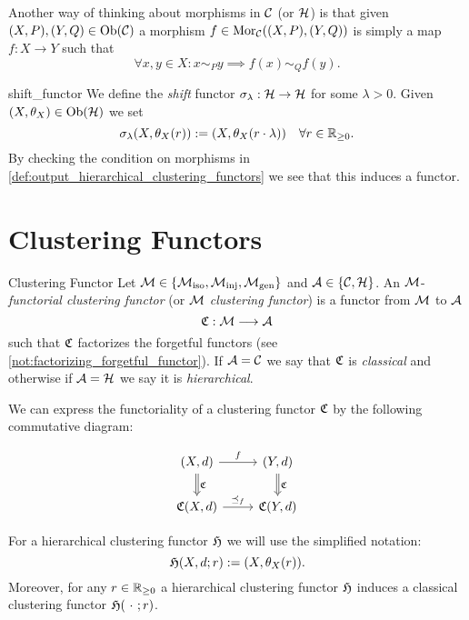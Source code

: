 Another way of thinking about morphisms in $\mathcal{C}$ (or $\mathcal{H}$) is that given $(X,P), (Y,Q) \in \mathrm {Ob}(\mathcal{C})$ a morphism $f \in \mathrm {Mor}_{\mathcal{C}}((X,P), (Y,Q))$ is simply a map $f: X \to Y$ such that
$$
\forall x,y \in X: x \sim_P y \implies f(x) \sim_Q f(y).
$$

\begin{definition}{}{shift_functor}
We define the \emph{shift} functor $\sigma_\lambda: \mathcal{H} \to \mathcal{H}$ for some $\lambda > 0$. Given $(X, \theta_X) \in \mathrm {Ob}(\mathcal{H})$ we set
$$
\sigma_\lambda(X, \theta_X(r)) := (X, \theta_X(r \cdot \lambda)) \quad \forall r \in \mathbb R_{\geq0}.
$$
By checking the condition on morphisms in \ref{def:output_hierarchical_clustering_functors} we see that this induces a functor.

\end{definition}

\section{Clustering Functors}
\begin{definition}{Clustering Functor \cite[Sec.~4.1]{Carlsson2010}}{}
Let $\mathcal{M} \in \{{\mathcal{M}_\mathrm{iso}}, {\mathcal{M}_\mathrm{inj}}, {\mathcal{M}_\mathrm{gen}}\}$ and $\mathcal{A} \in \{\mathcal{C}, \mathcal{H}\}$. An $\mathcal{M}$-\emph{functorial clustering functor} (or $\mathcal{M}$ \emph{clustering functor}) is a functor from $\mathcal{M}$ to $\mathcal{A}$
$$\mathfrak{C} : \mathcal{M} \longrightarrow \mathcal{A}$$
such that $\mathfrak{C}$ factorizes the forgetful functors (see \ref{not:factorizing_forgetful_functor}). If $\mathcal{A} = \mathcal{C}$ we say that $\mathfrak{C}$ is \emph{classical} and otherwise if $\mathcal{A} = \mathcal{H}$ we say it is \emph{hierarchical}.
\end{definition}

We can express the functoriality of a clustering functor $\mathfrak{C}$ by the following commutative diagram:

\begin{equation*}
    \begin{tikzcd}
    {(X,d)} \arrow[r, "f"] \arrow[d, "\Cf", Rightarrow] & {(Y,d)} \arrow[d, "\Cf", Rightarrow] \\
    {\Cf(X,d)} \arrow[r, "\refines_f"]                  & {\Cf(Y,d)}
    \end{tikzcd}
\end{equation*}

For a hierarchical clustering functor $\mathfrak{H}$ we will use the simplified notation:
$$
\mathfrak{H}(X,d;r) := (X,\theta_X(r)).
$$
Moreover, for any $r \in \mathbb R_{\geq0}$ a hierarchical clustering functor $\mathfrak{H}$ induces a classical clustering functor $\Hf(\ \cdot \ ;r)$.

